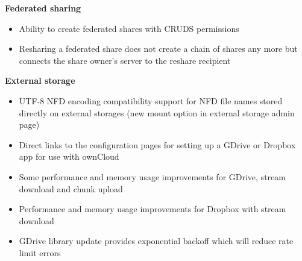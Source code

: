 \documentclass[letterpaper,10pt,english]{sphinxmanual}
\begin{document}
\textbf{Federated sharing}
\begin{itemize}
\item {} 
Ability to create federated shares with CRUDS permissions

\item {} 
Resharing a federated share does not create a chain of shares any more but connects the
share owner's server to the reshare recipient

\end{itemize}

\textbf{External storage}
\begin{itemize}
\item {} 
UTF-8 NFD encoding compatibility support for NFD file names stored directly on external
storages (new mount option in external storage admin page)

\item {} 
Direct links to the configuration pages for setting up a GDrive or Dropbox app for use with ownCloud

\item {} 
Some performance and memory usage improvements for GDrive, stream download and chunk upload

\item {} 
Performance and memory usage improvements for Dropbox with stream download

\item {} 
GDrive library update provides exponential backoff which will reduce rate limit errors

\end{itemize}
\end{document}

